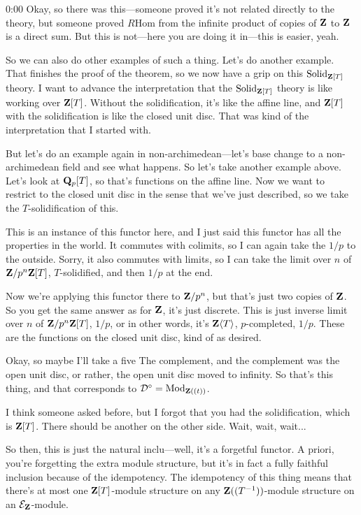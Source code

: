 \begin{unfinished}{0:00}
Okay, so there was this---someone proved it's not related directly to the theory, but someone proved $R\mathrm{Hom}$ from the infinite product of copies of $\mathbf Z$ to $\mathbf Z$ is a direct sum. But this is not---here you are doing it in---this is easier, yeah.

So we can also do other examples of such a thing. Let's do another example. That finishes the proof of the theorem, so we now have a grip on this $\mathrm{Solid}_{\mathbf Z[T]}$ theory. I want to advance the interpretation that the $\mathrm{Solid}_{\mathbf Z[T]}$ theory is like working over $\mathbf Z[T]$. Without the solidification, it's like the affine line, and $\mathbf Z[T]$ with the solidification is like the closed unit disc. That was kind of the interpretation that I started with.

But let's do an example again in non-archimedean---let's base change to a non-archimedean field and see what happens. So let's take another example above. Let's look at $\mathbf Q_p[T]$, so that's functions on the affine line. Now we want to restrict to the closed unit disc in the sense that we've just described, so we take the $T$-solidification of this.

This is an instance of this functor here, and I just said this functor has all the properties in the world. It commutes with colimits, so I can again take the $1/p$ to the outside. Sorry, it also commutes with limits, so I can take the limit over $n$ of $\mathbf Z/p^n\mathbf Z[T]$, $T$-solidified, and then $1/p$ at the end.

Now we're applying this functor there to $\mathbf Z/p^n$, but that's just two copies of $\mathbf Z$. So you get the same answer as for $\mathbf Z$, it's just discrete. This is just inverse limit over $n$ of $\mathbf Z/p^n\mathbf Z[T]$, $1/p$, or in other words, it's $\mathbf Z\langle T\rangle$, $p$-completed, $1/p$. These are the functions on the closed unit disc, kind of as desired.

Okay, so maybe I'll take a five
The complement, and the complement was the open unit disc, or rather, the open unit disc moved to infinity. So that's this thing, and that corresponds to $\mathcal{D}^\circ = \mathrm{Mod}_{\mathbf Z((t))}$.

I think someone asked before, but I forgot that you had the solidification, which is $\mathbf Z[T]$. There should be another on the other side. Wait, wait, wait...

So then, this is just the natural inclu---well, it's a forgetful functor. A priori, you're forgetting the extra module structure, but it's in fact a fully faithful inclusion because of the idempotency. The idempotency of this thing means that there's at most one $\mathbf Z[T]$-module structure on any $\mathbf Z((T^{-1}))$-module structure on an $\mathcal{E}_\mathbf Z$-module.


\end{unfinished}

